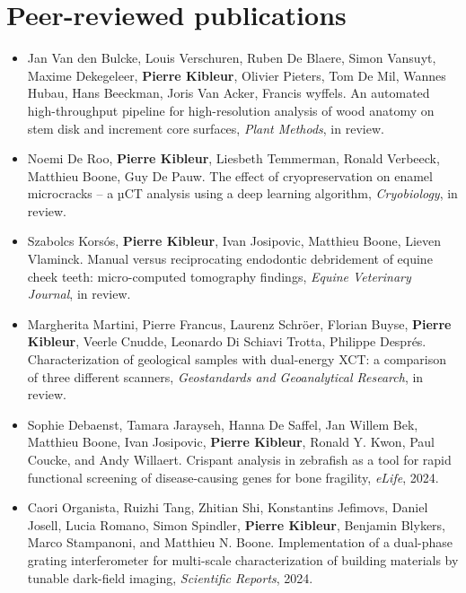 \documentclass[oneside, english, 10pt, a4paper]{memoir}
\begin{document}
	
	\section{Peer-reviewed publications}
	\begin{itemize}[leftmargin=*]   	    	
		\item Jan Van den Bulcke, Louis Verschuren, Ruben De Blaere, Simon Vansuyt, Maxime Dekegeleer, \textbf{Pierre Kibleur}, Olivier Pieters, Tom De Mil, Wannes Hubau, Hans Beeckman, Joris Van Acker, Francis wyffels. An automated high-throughput pipeline for high-resolution analysis of wood anatomy on stem disk and increment core surfaces, \emph{Plant Methods}, in review.
		
		\item Noemi De Roo, \textbf{Pierre Kibleur}, Liesbeth Temmerman, Ronald Verbeeck, Matthieu Boone, Guy De Pauw. The effect of cryopreservation on enamel microcracks – a µCT analysis using a deep learning algorithm, \emph{Cryobiology}, in review. 
		
		\item Szabolcs Korsós, \textbf{Pierre Kibleur}, Ivan Josipovic, Matthieu Boone, Lieven Vlaminck. Manual versus reciprocating endodontic debridement of equine cheek teeth: micro-computed tomography findings, \emph{Equine Veterinary Journal}, in review.
		
		\item Margherita Martini, Pierre Francus, Laurenz Schröer, Florian Buyse, \textbf{Pierre Kibleur}, Veerle Cnudde, Leonardo Di Schiavi Trotta, Philippe Després. Characterization of geological samples with dual-energy XCT: a comparison of three different scanners, \emph{Geostandards and Geoanalytical Research}, in review.
		
		\item Sophie Debaenst, Tamara Jarayseh, Hanna De Saffel, Jan Willem Bek, Matthieu Boone, Ivan Josipovic, \textbf{Pierre Kibleur}, Ronald Y. Kwon, Paul Coucke, and Andy Willaert. Crispant analysis in zebrafish as a tool for rapid functional screening of disease-causing genes for bone fragility, \emph{eLife}, 2024.
		
		\item Caori Organista, Ruizhi Tang, Zhitian Shi, Konstantins Jefimovs, Daniel Josell, Lucia Romano, Simon Spindler, \textbf{Pierre Kibleur}, Benjamin Blykers, Marco Stampanoni, and Matthieu N. Boone. Implementation of a dual-phase grating interferometer for multi-scale characterization of building materials by tunable dark-field imaging, \emph{Scientific Reports}, 2024.
		

\end{itemize}
\end{document}
